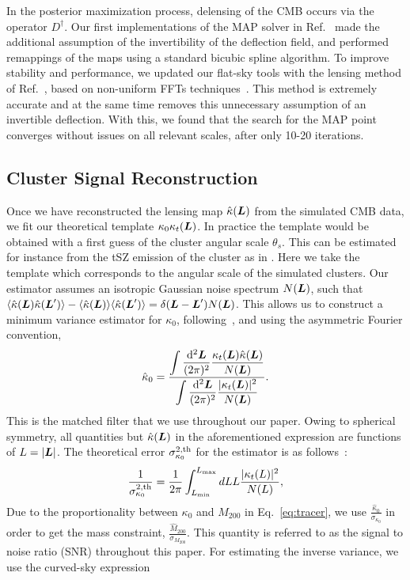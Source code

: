 \documentclass[prd, superscriptaddress, tightenlines, longbibliography, nofootinbib, eqsecnum, amsfonts, amsmath, floatfix, twocolumn, notitlepage]{revtex4-2}
\newcommand{\diff}{\mathop{}\!\mathrm{d}}
\begin{document}
In the posterior maximization process, delensing of the CMB occurs via the operator $D^\dagger$. Our first implementations of the MAP solver in Ref.~\cite{Carron:2017mqf} made the additional assumption of the invertibility of the deflection field, and performed remappings of the maps using a standard bicubic spline algorithm. To improve stability and performance, we updated our flat-sky tools with the lensing method of Ref.~\cite{Reinecke:2023gtp}, based on non-uniform FFTs techniques~\cite{Barnett2019, Barnett2020}. This method is extremely accurate and at the same time removes this unnecessary assumption of an invertible deflection. With this, we found that the search for the MAP point converges without issues on all relevant scales, after only 10-20 iterations.


\subsection{Cluster Signal Reconstruction}
\label{sec:cluster_mass}

Once we have reconstructed the lensing map $\hat{\kappa} (\vL)$ from the simulated CMB data, we fit our theoretical template $\kappa_0\kappa_t (\vL)$.  In practice the template would be obtained with a first guess of the cluster angular scale $\theta_s$. This can be estimated for instance from the tSZ emission of the cluster as in \cite{Zubeldia:2019brr}. Here we take the template which corresponds to the angular scale of the simulated clusters.
Our estimator assumes an isotropic Gaussian noise spectrum $N(\vL)$, such that $\langle{\hat{\kappa} (\vL) \hat{\kappa} (\vL')}\rangle - \langle{\hat{\kappa} (\vL)}\rangle \langle \hat{\kappa} (\vL') \rangle = \delta(\vL - \vL') N (\vL)$. This allows us to construct a minimum variance estimator for $\kappa_0$, following~\cite{Zubeldia:2019brr}, and using the asymmetric Fourier convention,
\begin{equation}\label{eq:kappa_0}
    \hat{\kappa}_0 = \frac{ \displaystyle \int \frac{\diff^2\vL}{(2\pi)^2} \frac{\kappa_t(\vL) \hat \kappa(\vL)}{N(\vL)}}{\displaystyle  \int\frac{\diff^2\vL}{(2\pi)^2} \frac{|\kappa_t(\vL)|^2}{N(\vL)}}.
\end{equation}
This is the matched filter that we use throughout our paper. Owing to spherical symmetry, all quantities but $\hat{\kappa} (\vL)$ in the aforementioned expression are functions of $L = |\vL|$. The theoretical error $\sigma^{2,\rm th}_{\kappa_0}$ for the estimator is as follows~\cite{Zubeldia:2019brr}:
\begin{equation}\label{eq:kappa_0_noise}
\frac{1}{\sigma^{2,\text{th}}_{\kappa_0}} = \frac{1}{2\pi}\int_{L_{\rm min}}^{L_{\rm max}} dL L \frac{|\kappa_t(L)|^2}{N(L)},
\end{equation}
Due to the proportionality between $\kappa_0$ and $M_{200}$ in Eq.~\ref{eq:tracer}, we use $\frac{\hat{\kappa}_0}{\sigma_{\kappa_0}}$ in order to get the mass constraint, $\frac{\hat{M}_{200}}{\sigma_{M_{200}}}$. This quantity is referred to as the signal to noise ratio (SNR) throughout this paper. For estimating the inverse variance, we use the curved-sky expression
\end{document}
